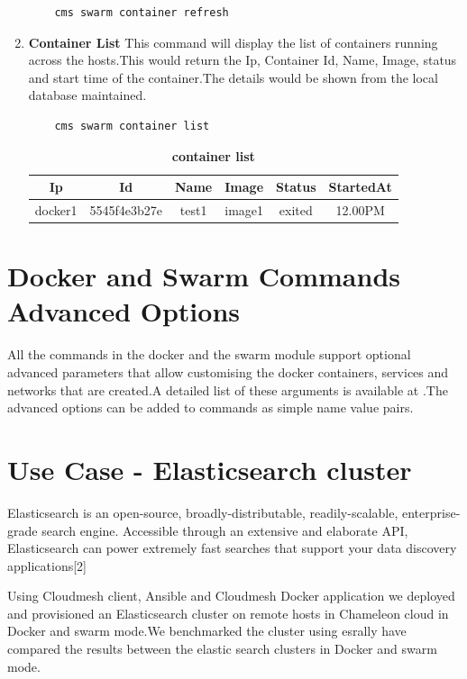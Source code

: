 \documentclass[9pt,twocolumn,twoside]{../../styles/osajnl}
\begin{document}
\begin{enumerate}
    \begin{verbatim}
    cms swarm container refresh
    \end{verbatim} 

    \item \textbf{Container List}
    This command will display the list of containers running across the hosts.This would return the Ip, Container Id, Name, Image, status and start time of the container.The details would be shown from the local database maintained.
    
    \begin{verbatim}
    cms swarm container list
    \end{verbatim} 
    
     \begin{table}[htbp]
     \caption{\bf container list }
     \begin{tabular}{cccccc}
     \hline
      Ip & Id & Name & Image &Status&StartedAt\\
      \hline
      docker1 & 5545f4e3b27e & test1 & image1 &exited & 12.00PM \\
     \hline
     \end{tabular}
     \label{tab:tab10}
     \end{table}
\end{enumerate}

 \section{Docker and Swarm Commands Advanced Options}

All the commands in the docker and the swarm module support optional advanced parameters that allow customising the docker containers, services and networks that are created.A detailed list of these arguments is available at \cite{Docker-Python-SDK}.The advanced options can be added to commands as simple name value pairs.

\section{Use Case - Elasticsearch cluster }
 Elasticsearch\cite{www-ElasticSearch} is an open-source, broadly-distributable, readily-scalable, enterprise-grade search engine. Accessible through an extensive and elaborate API, Elasticsearch can power extremely fast searches that support your data discovery applications[2]

 Using Cloudmesh  client, Ansible and Cloudmesh Docker application we deployed and provisioned an Elasticsearch cluster on remote hosts in Chameleon cloud in Docker and swarm mode.We benchmarked the cluster using esrally\cite{www-ElasticSearchRally}  have compared the results between the elastic search clusters in Docker and swarm mode.
\end{document}
